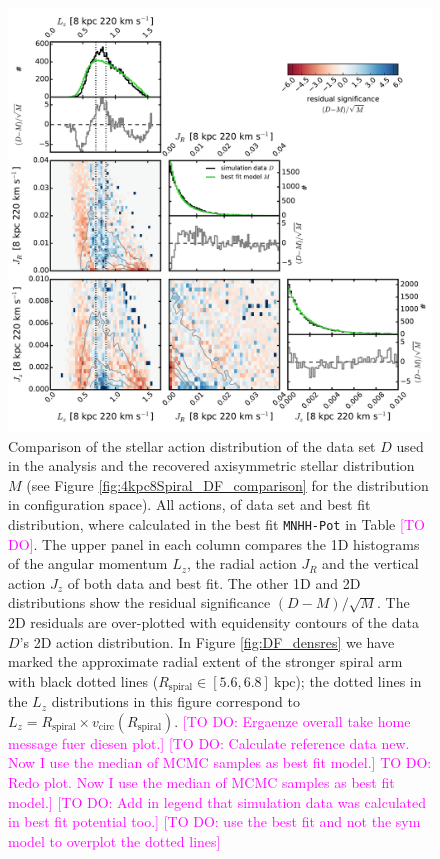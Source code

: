 \documentclass[iop,revtex4,numberedappendix,appendixfloats]{emulateapj}
\newcommand{\Wilma}[1]{\textcolor{Magenta}{#1}}
\begin{document}
\begin{figure}[!htbp]
\centering
\includegraphics[width=\columnwidth]{fig/MNdHHdiffSph2_4kpc8Spiral_a_data_bestfit_residuals_only_actions.pdf}
\caption{Comparison of the stellar action distribution of the data set $D$ used in the analysis and the recovered axisymmetric stellar distribution $M$ (see Figure \ref{fig:4kpc8Spiral_DF_comparison} for the distribution in configuration space). All actions, of data set and best fit distribution, where calculated in the best fit \texttt{MNHH-Pot} in Table \Wilma{[TO DO]}. The upper panel in each column compares the 1D histograms of the  angular momentum $L_z$, the radial action $J_R$ and the vertical action $J_z$ of both data and best fit. The other 1D and 2D distributions show the residual significance $(D-M)/\sqrt{M}$. The 2D residuals are over-plotted with equidensity contours of the data $D$'s 2D action distribution. In Figure \ref{fig:DF_densres} we have marked the approximate radial extent of the stronger spiral arm with black dotted lines ($R_\text{spiral} \in [5.6,6.8]~\text{kpc}$); the dotted lines in the $L_z$ distributions in this figure correspond to $L_z = R_\text{spiral} \times v_\text{circ}(R_\text{spiral})$.  \Wilma{[TO DO: Ergaenze overall take home message fuer diesen plot.]} \Wilma{[TO DO: Calculate reference data new. Now I use the median of MCMC samples as best fit model.]} \Wilma{TO DO: Redo plot. Now I use the median of MCMC samples as best fit model.]} \Wilma{[TO DO: Add in legend that simulation data was calculated in best fit potential too.]} \Wilma{[TO DO: use the best fit and not the sym model to overplot the dotted lines]}}
\label{fig:4kpc8Spiral_actions}
\end{figure}
\end{document}
